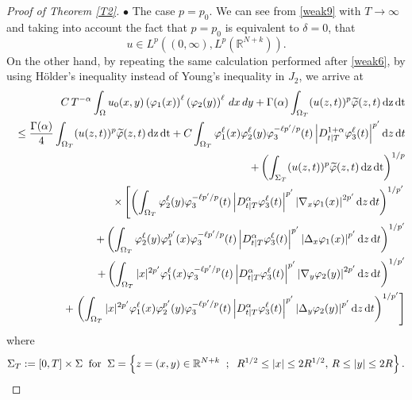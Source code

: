 \documentclass[reqno,11pt]{amsart}
\numberwithin{equation}{section}
\begin{document}
\begin{proof}[Proof of Theorem \ref{T2}]
	\noindent $\bullet$ The case $p=p_0$. We can see from \eqref{weak9} with $T\rightarrow\infty$ and taking into account the fact that $p=p_0$ is equivalent to $\delta=0$, that
	\begin{equation}\label{regularityA}
		u\in L^p((0,\infty),L^p(\mathbb{R}^{N+k})).
	\end{equation}
	On the other hand, by repeating the same calculation performed after \eqref{weak6}, by using H\"older's inequality instead of Young's inequality in $J_2$, we arrive at
	\begin{eqnarray*}
		&{}&C\,T^{-\alpha}\int_{\Omega}u_0(x,y)\left(\varphi_1(x)\right)^\ell \left(\varphi_2(y)\right)^\ell \,dx\,dy+\Gamma(\alpha)\int_{\Omega_T}(u(z,t))^{p}\widetilde{\varphi}(z,t)\,\mathrm{dz}\,\mathrm{dt}\\
		&{}&\leq \frac{\Gamma(\alpha)}{4} \int_{\Omega_T}(u(z,t))^{p}\widetilde{\varphi}(z,t)\,\mathrm{dz}\,\mathrm{dt}+C\int_{\Omega_T}\varphi_1^\ell(x)\varphi_2^\ell(y)\varphi_3^{-\ell p^\prime/p}(t)\left|D^{1+\alpha}_{t|T} \varphi^\ell_3(t)\right|^{p'}\mathrm{d}z\,\mathrm{d}t\\
		&{}&+\left(\int_{\Sigma_T}(u(z,t))^{p}\widetilde{\varphi}(z,t)\,\mathrm{dz}\,\mathrm{dt}\right)^{1/p} \notag\\
		&&\times \left[ \left(\int_{\Omega_T}\varphi_2^\ell(y)\varphi_3^{-\ell p^\prime/p}(t)\left|D^{\alpha}_{t|T} \varphi^\ell_3(t)\right|^{p'}\left|\nabla_x \varphi_1(x)\right|^{2p'}\mathrm{d}z\,\mathrm{d}t\right)^{1/p'} \right.\notag\\
		&& \quad + \left(\int_{\Omega_T}\varphi_2^\ell(y)\varphi_1^{p'}(x)\varphi_3^{-\ell p^\prime/p}(t)\left|D^{\alpha}_{t|T} \varphi^\ell_3(t)\right|^{p'}\left|\Delta_x \varphi_1(x)\right|^{p'}\mathrm{d}z\,\mathrm{d}t\right)^{1/p'}\\
		&& \quad + \left(\int_{\Omega_T}|x|^{2p'}\varphi_1^\ell(x)\varphi_3^{-\ell p^\prime/p}(t)\left|D^{\alpha}_{t|T} \varphi^\ell_3(t)\right|^{p'}\left|\nabla_y \varphi_2(y)\right|^{2p'}\mathrm{d}z\,\mathrm{d}t\right)^{1/p'}\notag\\
		&& \quad + \left. \left(\int_{\Omega_T}|x|^{2p'}\varphi_1^\ell(x)\varphi_2^{p'}(y)\varphi_3^{-\ell p^\prime/p}(t)\left|D^{\alpha}_{t|T} \varphi^\ell_3(t)\right|^{p'}\left|\Delta_y \varphi_2(y)\right|^{p'}\mathrm{d}z\,\mathrm{d}t\right)^{1/p'} \right]
	\end{eqnarray*}
	where
	$$\Sigma_T:=[0,T]\times\Sigma\;\;\text{for}\;\; \Sigma=\left\{ z=(x,y)\in{\mathbb{R}}^{N+k}\hspace{2
		mm};\hspace{2mm}R^{1/2}\leq |x|\leq 2 R^{1/2},\,R\leq |y|\leq 2 R\right\}.$$

\end{proof}
\end{document}
